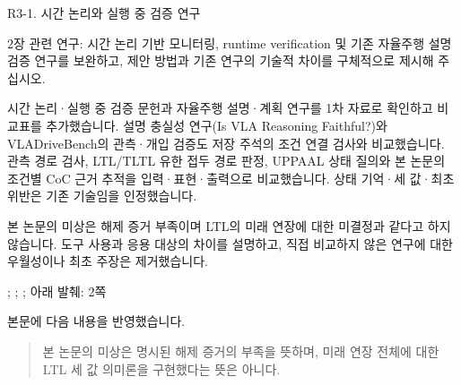 




\clearpage

\begin{reviewitem}{R3-1. 시간 논리와 실행 중 검증 연구}

\begin{reviewercomment}

2장 관련 연구: 시간 논리 기반 모니터링, runtime verification 및 기존 자율주행 설명 검증 연구를 보완하고, 제안 방법과 기존 연구의 기술적 차이를 구체적으로 제시해 주십시오.

\end{reviewercomment}

\begin{authorresponse}

시간 논리·실행 중 검증 문헌과 자율주행 설명·계획 연구를 1차 자료로 확인하고 비교표를 추가했습니다. 설명 충실성 연구(Is VLA Reasoning Faithful?)와 VLADriveBench의 관측·개입 검증도 저장 주석의 조건 연결 검사와 비교했습니다. 관측 경로 검사, LTL/TLTL 유한 접두 경로 판정, UPPAAL 상태 질의와 본 논문의 조건별 CoC 근거 추적을 입력·표현·출력으로 비교했습니다. 상태 기억·세 값·최초 위반은 기존 기술임을 인정했습니다.

본 논문의 미상은 해제 증거 부족이며 LTL의 미래 연장에 대한 미결정과 같다고 하지 않습니다. 도구 사용과 응용 대상의 차이를 설명하고, 직접 비교하지 않은 연구에 대한 우월성이나 최초 주장은 제거했습니다.

\end{authorresponse}

\begin{manuscriptrevision}{; ; ; 아래 발췌: 2쪽}

본문에 다음 내용을 반영했습니다.

\begin{quote}

본 논문의 미상은 명시된 해제 증거의 부족을 뜻하며, 미래 연장 전체에 대한 LTL 세 값 의미론을 구현했다는 뜻은 아니다.

\end{quote}

\end{manuscriptrevision}

\end{reviewitem}


